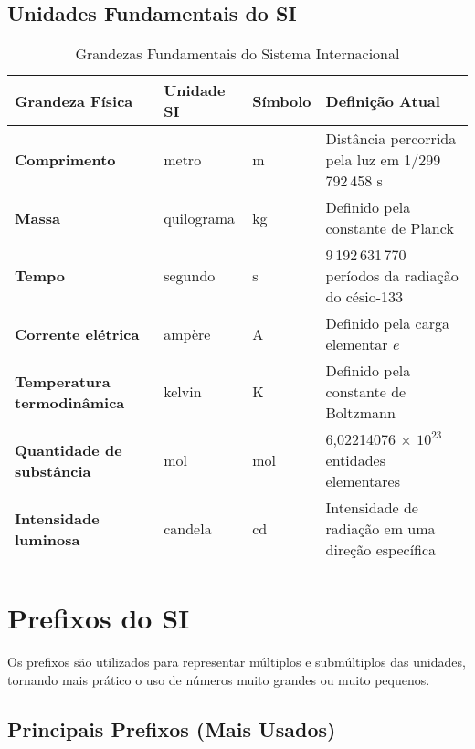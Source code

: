 \documentclass[portuguese,11pt,a4paper,oneside,onecolumn,notitlepage]{article}
\begin{document}
	\subsection*{Unidades Fundamentais do SI}
	
	\begin{table}[H]
		\centering
		\begin{tabular}{>{\bfseries}l l l l}
			\toprule
			Grandeza Física & Unidade SI & Símbolo & Definição Atual \\
			\midrule
			Comprimento & metro & m & Distância percorrida pela luz em 1/299\,792\,458 s \\
			Massa & quilograma & kg & Definido pela constante de Planck \\
			Tempo & segundo & s & 9\,192\,631\,770 períodos da radiação do césio-133 \\
			Corrente elétrica & ampère & A & Definido pela carga elementar $e$ \\
			Temperatura termodinâmica & kelvin & K & Definido pela constante de Boltzmann \\
			Quantidade de substância & mol & mol & 6{,}02214076 × $10^{23}$ entidades elementares \\
			Intensidade luminosa & candela & cd & Intensidade de radiação em uma direção específica \\
			\bottomrule
		\end{tabular}
		\caption{Grandezas Fundamentais do Sistema Internacional}
	\end{table}
	
	\section{Prefixos do SI}
	
	Os prefixos são utilizados para representar múltiplos e submúltiplos das unidades, tornando mais prático o uso de números muito grandes ou muito pequenos.
	
	\subsection*{Principais Prefixos (Mais Usados)}
	
\end{document}

